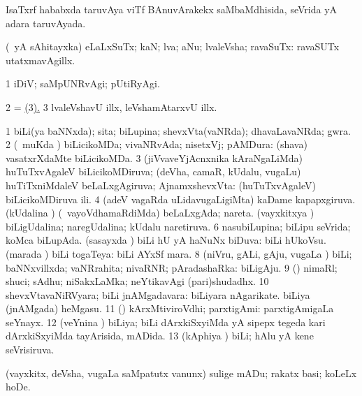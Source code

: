 {{{{{{\bentry
{} 
\gl{\gu}
\expl{}
\bmng
IsaTxrf hababxda taruvAya viTf BAnuvArakekx saMbaMdhisida, seVrida yA adara taruvAyada. 
\emng
\eentry

\bentry
{} 
\gl{\nA}
\expl{}
\bmng
 (\pArxparx\ yA sAhitayxka) eLaLxSuTx; kaN; lva; aNu; lvaleVsha; ravaSuTx:  ravaSUTx utatxmavAgillx. 
\emng

\noindent 
\gl{\pagu}
\expl{}
\bmng
\bnum
\num{1}  iDiV; saMpUNRvAgi; pUtiRyAgi. 
\num{2}  = \hyperlink{whit2 pagu3}{\pagu($3$).} 
\hypertarget{whit2 pagu3}{} 
\num{3} lvaleVshavU illx, leVshamAtarxvU illx. 
\enum
\emng
\eentry

\bentry
{} 
\gl{\gu}
\expl{}
\bmng
\bnum
\num{1} biLi(ya baNNxda); sita; biLupina; shevxVta(vaNRda); dhavaLavaNRda; gwra. 
\num{2} (\kanmu\ muKda \vi) biLicikoMDa; vivaNRvAda; nisetxVj; pAMDura:  (shava) vasatxrXdaMte biLicikoMDa. 
\num{3} (jiVvaveYjAcnxnika kAraNgaLiMda) huTuTxvAgaleV biLicikoMDiruva; (deVha, camaR, kUdalu, \mo vugaLu) huTiTxniMdaleV beLaLxgAgiruva; AjnamxshevxVta:  (huTuTxvAgaleV) biLicikoMDiruva ili. 
\num{4} (adeV vagaRda uLidavugaLigiMta) kaDame kapapxgiruva. 
\banum
{} (kUdalina \vi) (\kanmu\ vayoVdhamaRdiMda) beLaLxgAda; nareta. 
 (vayxkitxya \vi) biLigUdalina; naregUdalina; kUdalu naretiruva. 
\eanum
\numie
\num{6} nasubiLupina; biLipu seVrida; koMca biLupAda. 
\banum
{} (sasayxda \vi) biLi hU yA haNuNx biDuva:  biLi hUkoVsu. 
 (marada \vi) biLi togaTeya:  biLi AYxSf mara. 
\eanum
\numie
\num{8} (niVru, gALi, gAju, \mo vugaLa \vi) biLi; baNNxvillxda; vaNRrahita; nivaRNR; pAradashaRka:  biLigAju. 
\num{9} (\AmA) nimaRl; shuci; sAdhu; niSakxLaMka; neYtikavAgi (pari)shudadhx. 
\num{10}  shevxVtavaNiRVyara; biLi jnAMgadavara:  biLiyara nAgarikate.  biLiya (jnAMgada) heMgasu. 
\num{11}  (\ca) kArxMtiviroVdhi; parxtigAmi:  parxtigAmigaLa seYnayx. 
\num{12} (veYnina \vi) biLiya; biLi dArxkiSxyiMda yA sipepx tegeda kari dArxkiSxyiMda tayArisida, mADida. 
\num{13} (kAphiya \vi) biLi; hAlu yA kene seVrisiruva. 
\enum
\emng

\noindent 
\gl{\pagu}
\expl{}
\bmng
{} (vayxkitx, deVsha, \mo vugaLa saMpatutx \mo vanunx) sulige mADu; rakatx basi; koLeLx hoDe. 
\emng
\eentry

}}}}}}
